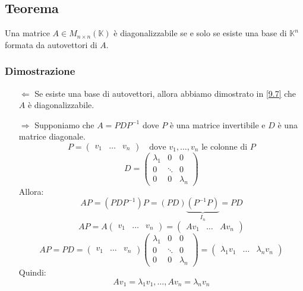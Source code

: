 \documentclass[a4paper]{article}
\theoremstyle{break}
\theoremstyle{break}
\theoremstyle{break}
\theoremstyle{break}
\begin{document}
\subsection{Teorema}
\label{10.2}
Una matrice \( A \in M_{n \times n}(\mathbb{K}) \) è diagonalizzabile se e solo se
esiste una base di \( \mathbb{K}^n \) formata da autovettori di \( A \).

\subsubsection{Dimostrazione}
\begin{itemize}
  \item[\( \Leftarrow \)] Se esiste una base di autovettori, allora abbiamo dimostrato
    in \ref{9.7} che \( A \) è diagonalizzabile.

  \item[\( \Rightarrow \)] Supponiamo che \( A = PDP^{-1} \) dove \( P \) è una matrice
    invertibile e \( D \) è una matrice diagonale.
    \[
    P = \begin{pmatrix} 
      v_1 & \ldots & v_n
    \end{pmatrix}
    \quad \text{dove } v_1, \ldots, v_n \text{ le colonne di } P
    \] 
    \[
    D = \begin{pmatrix} 
      \lambda_1 & 0 & 0\\
      0 & \ddots & 0\\
      0 & 0 & \lambda_n
    \end{pmatrix}
    \] 
    Allora:
    \[
      AP = (PDP^{-1})P = (PD)\underbrace{(P^{-1}P)}_{I_n} = PD
    \] 
    \[
    AP = A \begin{pmatrix} 
      v_1 & \ldots & v_n
    \end{pmatrix}
    = \begin{pmatrix} 
      Av_1 & \ldots & Av_n
    \end{pmatrix}
    \] 
    \[
    AP = PD = \begin{pmatrix} 
      v_1 & \ldots & v_n
    \end{pmatrix}
    \begin{pmatrix} 
      \lambda_1 & 0 & 0\\
      0 & \ddots & 0\\
      0 & 0 & \lambda_n
    \end{pmatrix}
    = \begin{pmatrix} 
      \lambda_1 v_1 & \ldots & \lambda_n v_n
    \end{pmatrix}
    \] 
    Quindi:
    \[
    Av_1 = \lambda_1 v_1, \ldots, Av_n = \lambda_n v_n
    \] 


\end{itemize}
\end{document}
